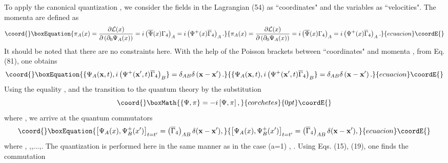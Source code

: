 \documentclass[a4paper,12pt]{article}
\begin{document}
To apply the canonical quantization \cite{Dirac}, we consider the
fields \coordHE{} in the Lagrangian (54) as ``coordinates" and
the variables \coordHE{} as ``velocities". The momenta
are defined as
\begin{equation}\coord{}\boxEquation{
\pi_A (x)=\frac{\partial {\cal L}(x)}{\partial \left(\partial_0
\Psi_A (x)\right)}=i\left(\overline{\Psi }(x)\Gamma_4 \right)_A=
i\left(\Psi^+ (x)\overline{\Gamma}_4 \right)_A  .\label{81}
}{
\pi_A (x)=\frac{\partial {\cal L}(x)}{\partial \left(\partial_0
\Psi_A (x)\right)}=i\left(\overline{\Psi }(x)\Gamma_4 \right)_A=
i\left(\Psi^+ (x)\overline{\Gamma}_4 \right)_A  .}{ecuacion}\coordE{}\end{equation}
It should be noted that there are no constraints here. With the
help of the Poisson brackets between ``coordinates" \coordHE{}
and momenta \coordHE{}, from Eq. (81), one obtains
\begin{equation}\coord{}\boxEquation{
\{\Psi_A (\mathbf{x},t),i\left(\Psi^+ (\mathbf{x}^{\prime }
,t)\overline{\Gamma}_4 \right)_B
\}=\delta_{AB}\delta\left(\mathbf{x}- \mathbf{x}^{\prime }\right)
. \label{82}
}{
\{\Psi_A (\mathbf{x},t),i\left(\Psi^+ (\mathbf{x}^{\prime }
,t)\overline{\Gamma}_4 \right)_B
\}=\delta_{AB}\delta\left(\mathbf{x}- \mathbf{x}^{\prime }\right)
. }{ecuacion}\coordE{}\end{equation}
Using the equality \coordHE{}, and the transition
to the quantum theory by the substitution
\[\coord{}\boxMath{
\{\Psi ,\pi \} =-i\left[\Psi,\pi \right] ,
}{corchetes}{0pt}\coordE{}\]
where \myHighlight{$\left[\Psi,\pi \right]= \Psi\pi -\pi \Psi$}\coordHE{}, we arrive at
the quantum commutators
\begin{equation}\coord{}\boxEquation{
\left[ \Psi _A(x),\Psi^+ _B(x^{\prime })\right] _{t=t^{\prime
}}=\left( \overline{\Gamma} _4\right) _{AB}\delta
(\mathbf{x}-\mathbf{x}^{\prime }) ,\label{83}
}{
\left[ \Psi _A(x),\Psi^+ _B(x^{\prime })\right] _{t=t^{\prime
}}=\left( \overline{\Gamma} _4\right) _{AB}\delta
(\mathbf{x}-\mathbf{x}^{\prime }) ,}{ecuacion}\coordE{}\end{equation}
where \coordHE{}, \coordHE{},\coordHE{},...,\coordHE{}. The quantization is performed here
in the same manner as in the case \coordHE{} (a=1) \cite{Kruglov1},
\cite{monogr}. Using Eqs. (15), (19), one finds the commutation
\end{document}

